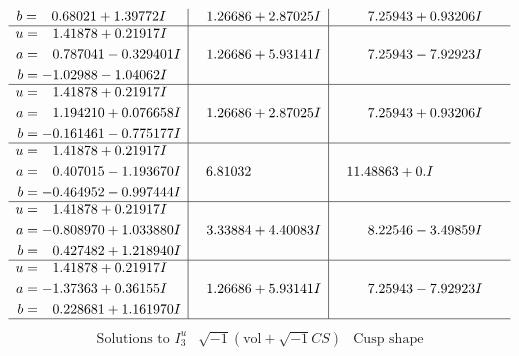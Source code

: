 \documentclass[1p]{elsarticle_modified}
\theoremstyle{definition}
\newcommand{\I}{\sqrt{-1}}
\begin{document}
$$\begin{array}{c|c|c}
\begin{aligned}
b &= \phantom{-}0.68021 + 1.39772 I\end{aligned}
 & \phantom{-}1.26686 + 2.87025 I & \phantom{-}7.25943 + 0.93206 I \\ \hline\begin{aligned}
u &= \phantom{-}1.41878 + 0.21917 I \\
a &= \phantom{-}0.787041 - 0.329401 I \\
b &= -1.02988 - 1.04062 I\end{aligned}
 & \phantom{-}1.26686 + 5.93141 I & \phantom{-}7.25943 - 7.92923 I \\ \hline\begin{aligned}
u &= \phantom{-}1.41878 + 0.21917 I \\
a &= \phantom{-}1.194210 + 0.076658 I \\
b &= -0.161461 - 0.775177 I\end{aligned}
 & \phantom{-}1.26686 + 2.87025 I & \phantom{-}7.25943 + 0.93206 I \\ \hline\begin{aligned}
u &= \phantom{-}1.41878 + 0.21917 I \\
a &= \phantom{-}0.407015 - 1.193670 I \\
b &= -0.464952 - 0.997444 I\end{aligned}
 & \phantom{-}6.81032\phantom{ +0.000000I} & \phantom{-}11.48863 + 0. I\phantom{ +0.000000I} \\ \hline\begin{aligned}
u &= \phantom{-}1.41878 + 0.21917 I \\
a &= -0.808970 + 1.033880 I \\
b &= \phantom{-}0.427482 + 1.218940 I\end{aligned}
 & \phantom{-}3.33884 + 4.40083 I & \phantom{-}8.22546 - 3.49859 I \\ \hline\begin{aligned}
u &= \phantom{-}1.41878 + 0.21917 I \\
a &= -1.37363 + 0.36155 I \\
b &= \phantom{-}0.228681 + 1.161970 I\end{aligned}
 & \phantom{-}1.26686 + 5.93141 I & \phantom{-}7.25943 - 7.92923 I\\
 \hline 
 \end{array}$$\newpage$$\begin{array}{c|c|c}  
\text{Solutions to }I^u_{3}& \I (\text{vol} + \sqrt{-1}CS) & \text{Cusp shape}\\
 \hline 
\begin{aligned}

\end{aligned}
\end{array}$$
\end{document}
